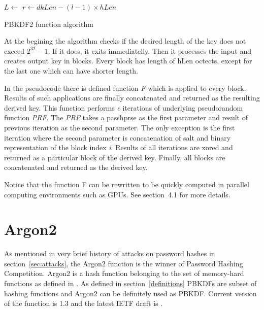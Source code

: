 \documentclass[nolof]{fithesis3}
\begin{document}
\begin{algorithm}
\DontPrintSemicolon
\LinesNumbered
{}
\(L \leftarrow \)  \;
\(r \leftarrow dkLen - (l - 1) \times hLen \)
 \;
\caption{PBKDF2 function algorithm}
\label{pbkdf2alg}
\end{algorithm}

At the begining the algorithm checks if the desired length of the key does not exceed \(2^{32} - 1\). If it does, it exits immediatelly. Then it processes the input and creates output key in blocks. Every block has length of hLen octects, except for the last one which can have shorter length. 

In the pseudocode there is defined function \emph{F} which is applied to every block. Results of such applications are finally concatenated and returned as the resulting derived key. This function performs \emph{c} iterations of underlying pseudorandom function \emph{PRF}. The \emph{PRF} takes a passhprse as the first parameter and result of previous iteration as the second parameter. The only exception is the first iteration where the second parameter is concatenation of salt and binary representation of the block index \emph{i}. Results of all iterations are xored and returned as a particular block of the derived key. Finally, all blocks are concatenated and returned as the derived key.

Notice that the function F can be rewritten to be quickly computed in parallel computing environments such as GPUs. See \parencite{mosnacek}{section~4.1} for more details.


\section{Argon2}
\label{argon2}
As mentioned in very brief history of attacks on password hashes in section~\ref{sec:attacks}, the Argon2 function is the winner of Password Hashing Competition. Argon2 is a hash function belonging to the set of memory-hard functions as defined in \parencite{memoryhard}. As defined in section~\ref{definitions} PBKDFs are subset of hashing functions and Argon2 can be definitely used as PBKDF. Current version of the function is 1.3 and the latest IETF draft is \parencite{argon2draft}.
\end{document}
